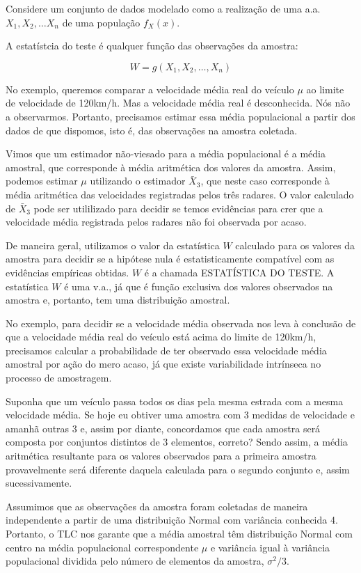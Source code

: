 \documentclass[
]{book}
\theoremstyle{definition}
\theoremstyle{definition}
\theoremstyle{definition}
\theoremstyle{remark}
\begin{document}
Considere um conjunto de dados modelado como a realização de uma a.a. \(X_1, X_2, \ldots X_n\) de uma população \(f_X(x)\).

A estatístcia do teste é qualquer função das observações da amostra:

\[W = g(X_1, X_2, \ldots, X_n)\]

No exemplo, queremos comparar a velocidade média real do veículo \(\mu\) ao limite de velocidade de 120km/h. Mas a velocidade média real é desconhecida. Nós não a observarmos. Portanto, precisamos estimar essa média populacional a partir dos dados de que dispomos, isto é, das observações na amostra coletada.

Vimos que um estimador não-viesado para a média populacional é a média amostral, que corresponde à média aritmética dos valores da amostra. Assim, podemos estimar \(\mu\) utilizando o estimador \(\bar{X}_3\), que neste caso corresponde à média aritmética das velocidades registradas pelos três radares. O valor calculado de \(\bar{X}_3\) pode ser utililizado para decidir se temos evidências para crer que a velocidade média registrada pelos radares não foi observada por acaso.

De maneira geral, utilizamos o valor da estatística \(W\) calculado para os valores da amostra para decidir se a hipótese nula é estatisticamente compatível com as evidências empíricas obtidas. \(W\) é a chamada ESTATÍSTICA DO TESTE. A estatística \(W\) é uma v.a., já que é função exclusiva dos valores observados na amostra e, portanto, tem uma distribuição amostral.

No exemplo, para decidir se a velocidade média observada nos leva à conclusão de que a velocidade média real do veículo está acima do limite de 120km/h, precisamos calcular a probabilidade de ter observado essa velocidade média amostral por ação do mero acaso, já que existe variabilidade intrínseca no processo de amostragem.

Suponha que um veículo passa todos os dias pela mesma estrada com a mesma velocidade média. Se hoje eu obtiver uma amostra com 3 medidas de velocidade e amanhã outras 3 e, assim por diante, concordamos que cada amostra será composta por conjuntos distintos de 3 elementos, correto? Sendo assim, a média aritmética resultante para os valores observados para a primeira amostra provavelmente será diferente daquela calculada para o segundo conjunto e, assim sucessivamente.

Assumimos que as observações da amostra foram coletadas de maneira independente a partir de uma distribuição Normal com variância conhecida 4. Portanto, o TLC nos garante que a média amostral têm distribuição Normal com centro na média populacional correspondente \(\mu\) e variância igual à variância populacional dividida pelo número de elementos da amostra, \(\sigma^2/3\).
\end{document}
